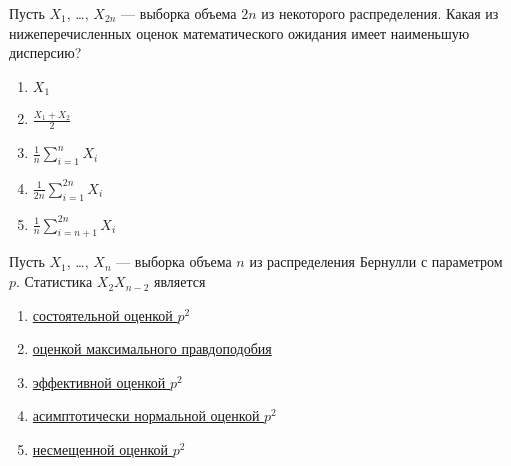 \documentclass[t]{beamer}
\begin{document}
 \begin{frame} \label{5} 
\begin{block}{5} 

Пусть $X_1$, \ldots, $X_{2 n}$ — выборка объема $2 n$ из некоторого распределения. Какая из нижеперечисленных оценок математического ожидания имеет наименьшую дисперсию?
 


 \end{block} 
\begin{enumerate} 
\item[] \hyperlink{5-No}{\beamergotobutton{} $X_1$}
\item[] \hyperlink{5-No}{\beamergotobutton{} $\frac{X_1+X_2}{2}$}
\item[] \hyperlink{5-No}{\beamergotobutton{} $\frac{1}{n} \sum_{i=1}^n X_i$}
\item[] \hyperlink{5-Yes}{\beamergotobutton{} $\frac{1}{2 n} \sum_{i=1}^{2 n} X_i$}
\item[] \hyperlink{5-No}{\beamergotobutton{} $\frac{1}{n} \sum_{i=n+1}^{2 n} X_i$}
\end{enumerate} 
\end{frame} 


 \begin{frame} \label{6} 
\begin{block}{6} 

Пусть $X_1$, \ldots, $X_n$ — выборка объема $n$ из распределения Бернулли с параметром $p$. Статистика $X_2 X_{n-2}$ является
 


 \end{block} 
\begin{enumerate} 
\item[] \hyperlink{6-No}{\beamergotobutton{} состоятельной оценкой $p^2$}
\item[] \hyperlink{6-No}{\beamergotobutton{} оценкой максимального правдоподобия}
\item[] \hyperlink{6-No}{\beamergotobutton{} эффективной оценкой $p^2$}
\item[] \hyperlink{6-No}{\beamergotobutton{} асимптотически нормальной оценкой $p^2$}
\item[] \hyperlink{6-Yes}{\beamergotobutton{} несмещенной оценкой $p^2$}
\end{enumerate} 
\end{frame} 
\end{document}
